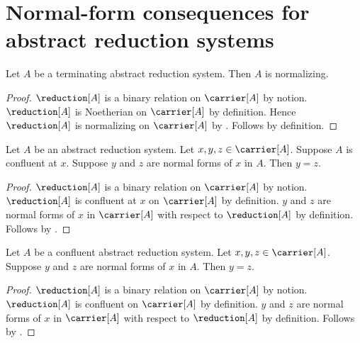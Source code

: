 





\section{Normal-form consequences for abstract reduction systems}

\begin{corollary}\label{terminating_reduction_system_is_normalizing}
    Let $A$ be a terminating abstract reduction system.
    Then $A$ is normalizing.
\end{corollary}
\begin{proof}
    $\reduction[A]$ is a binary relation on $\carrier[A]$ by notion.
    $\reduction[A]$ is Noetherian on $\carrier[A]$ by definition.
    Hence $\reduction[A]$ is normalizing on $\carrier[A]$
        by .
    Follows by definition.
\end{proof}

\begin{theorem}\label{confluent_at_reduction_system_normal_forms_unique}
    Let $A$ be an abstract reduction system.
    Let $x,y,z\in\carrier[A]$.
    Suppose $A$ is confluent at $x$.
    Suppose $y$ and $z$ are normal forms of $x$ in $A$.
    Then $y=z$.
\end{theorem}
\begin{proof}
    $\reduction[A]$ is a binary relation on $\carrier[A]$ by notion.
    $\reduction[A]$ is confluent at $x$ on $\carrier[A]$ by definition.
    $y$ and $z$ are normal forms of $x$ in $\carrier[A]$
        with respect to $\reduction[A]$ by definition.
    Follows by .
\end{proof}

\begin{corollary}\label{confluent_reduction_system_normal_forms_unique}
    Let $A$ be a confluent abstract reduction system.
    Let $x,y,z\in\carrier[A]$.
    Suppose $y$ and $z$ are normal forms of $x$ in $A$.
    Then $y=z$.
\end{corollary}
\begin{proof}
    $\reduction[A]$ is a binary relation on $\carrier[A]$ by notion.
    $\reduction[A]$ is confluent on $\carrier[A]$ by definition.
    $y$ and $z$ are normal forms of $x$ in $\carrier[A]$
        with respect to $\reduction[A]$ by definition.
    Follows by .
\end{proof}

